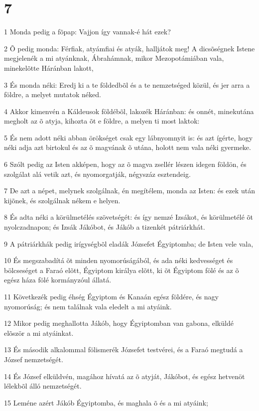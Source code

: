 \chapter{7}

\par 1 Monda pedig a fõpap: Vajjon így vannak-é hát ezek?
\par 2 Õ pedig monda: Férfiak, atyámfiai és atyák, halljátok meg! A dicsõségnek Istene megjelenék a mi atyánknak, Ábrahámnak, mikor Mezopotámiában vala, minekelõtte Háránban lakott,
\par 3 És monda néki: Eredj ki a te földedbõl és a te nemzetséged közül, és jer arra a földre, a melyet mutatok néked.
\par 4 Akkor kimenvén a Káldeusok földébõl, lakozék Háránban: és onnét, minekutána megholt az õ atyja, kihozta õt e földre, a melyen ti most laktok:
\par 5 És nem adott néki abban örökséget csak egy lábnyomnyit is: és azt ígérte, hogy néki adja azt birtokul és az õ magvának õ utána, holott nem vala néki gyermeke.
\par 6 Szólt pedig az Isten akképen, hogy az õ magva zsellér lészen idegen földön, és szolgálat alá vetik azt, és nyomorgatják, négyszáz esztendeig.
\par 7 De azt a népet, melynek szolgálnak, én megítélem, monda az Isten: és ezek után kijõnek, és szolgálnak nékem e helyen.
\par 8 És adta néki a körülmetélés szövetségét: és így nemzé Izsákot,  és körülmetélé õt nyolczadnapon; és Izsák Jákóbot, és Jákób a  tizenkét pátriárkhát.
\par 9 A pátriárkhák pedig irígységbõl eladák Józsefet Égyiptomba; de Isten vele vala,
\par 10 És megszabadítá õt minden nyomorúságából, és ada néki kedvességet és bölcseséget a Faraó elõtt, Égyiptom királya elõtt, ki õt Égyiptom fölé és az õ egész háza fölé kormányzóul állatá.
\par 11 Következék pedig éhség Égyiptom és Kanaán egész földére, és nagy nyomorúság; és nem találnak vala eledelt a mi atyáink.
\par 12 Mikor pedig meghallotta Jákób, hogy Égyiptomban van gabona, elküldé elõször a mi atyáinkat.
\par 13 És második alkalommal fölismerék Józsefet testvérei, és a Faraó megtudá a József nemzetségét.
\par 14 És József elküldvén, magához hívatá az õ atyját, Jákóbot, és egész hetvenöt lélekbõl álló nemzetségét.
\par 15 Leméne azért Jákób Égyiptomba, és maghala  õ és a mi atyáink;
